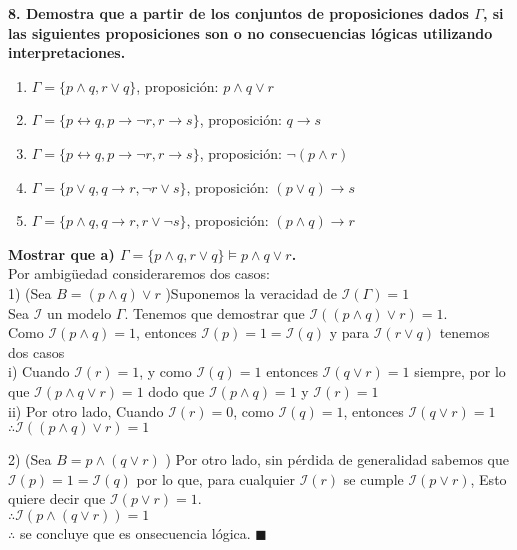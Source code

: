 \textbf{8. Demostra que a partir de los conjuntos de proposiciones dados $\Gamma$, si las siguientes proposiciones son o no consecuencias lógicas utilizando interpretaciones.}
\begin{multicols}{2}
	\begin{enumerate}[label=\alph*)]
		\item $\Gamma = \{p\land q, r\lor q\}$, proposición: $p \land q\lor r$
		\item $\Gamma = \{p\leftrightarrow q,p\rightarrow \neg r,r\rightarrow s\}$, proposición: $q\rightarrow s$
		\item $\Gamma = \{p\leftrightarrow q,p\rightarrow \neg r,r\rightarrow s\}$, proposición: $\neg (p\land r)$
		\item $\Gamma = \{p\lor q, q\rightarrow r, \neg r \lor s\}$, proposición: $(p\lor q)\rightarrow s$
		\item $\Gamma = \{p\land q, q\rightarrow r, r \lor \neg s\}$, proposición: $(p \land q)\rightarrow r$
	\end{enumerate}
\end{multicols}

\textbf{Mostrar que a) 	$\Gamma=\{p\land q, r\lor q\} \vDash p \land q\lor r$.}\\
Por ambigüedad consideraremos dos casos:\\
1) (Sea $B=(p\land q)\lor r$ )Suponemos la veracidad de $\mathcal{I}(\Gamma)=1$\\
Sea $\mathcal{I}$ un modelo $\Gamma$. Tenemos que demostrar que $\mathcal{I}((p \land q)\lor r)=1$.\\
Como $\mathcal{I}(p\land q)=1$, entonces $\mathcal{I}(p)=1=\mathcal{I}(q)$ y para $\mathcal{I}(r\lor q)$ tenemos dos casos\\
\indent i) Cuando $\mathcal{I}(r)=1$, y como $\mathcal{I}(q)=1$ entonces $\mathcal{I}(q\lor r)=1$ siempre, por lo que $\mathcal{I}(p \land q\lor r)=1$ dodo que $\mathcal{I}(p \land q)=1$ y $\mathcal{I}(r)=1$\\
\indent ii) Por otro lado, Cuando $\mathcal{I}(r)=0$, como $\mathcal{I}(q)=1$, entonces $\mathcal{I}(q\lor r)=1$\\
$\therefore \mathcal{I}((p\land q)\lor r)=1$\\
\indent

2) (Sea $B=p\land (q\lor r)$ ) Por otro lado, sin pérdida de generalidad sabemos que $\mathcal{I}(p)=1=\mathcal{I}(q)$
por lo que, para cualquier $\mathcal{I}(r)$ se cumple $\mathcal{I}(p\lor r)$, Esto quiere decir que $\mathcal{I}(p\lor r)=1$.\\
$\therefore \mathcal{I}(p\land (q\lor r))=1$\\
$\therefore$ se concluye que es onsecuencia lógica. $\blacksquare$
\vspace{5px}


